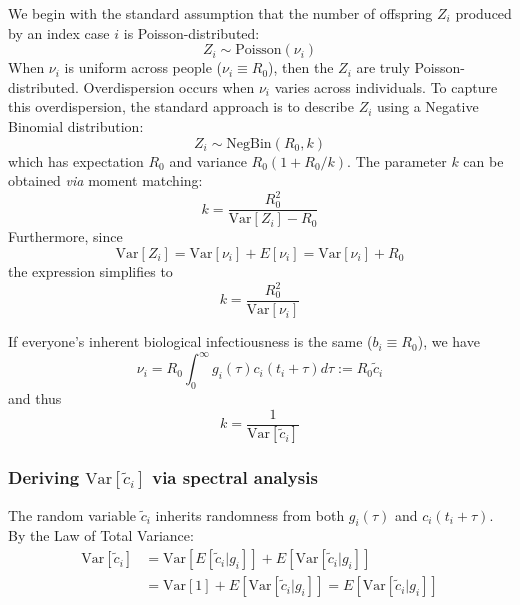 \documentclass[10pt]{article}
\begin{document}
We begin with the standard assumption that the number of offspring $Z_i$ produced by an index case $i$ is Poisson-distributed:
\begin{equation}
	Z_i \sim \text{Poisson}(\nu_i)
\end{equation}
When $\nu_i$ is uniform across people ($\nu_i \equiv R_0$), then the $Z_i$ are truly Poisson-distributed. Overdispersion occurs when $\nu_i$ varies across individuals. To capture this overdispersion, the standard approach is to describe $Z_i$ using a Negative Binomial distribution:
\begin{equation}
	Z_i \sim \text{NegBin}(R_0, k)
\end{equation}
which has expectation $R_0$ and variance $R_0 (1 + R_0 / k)$. The parameter $k$ can be obtained \textit{via} moment matching:
\begin{equation}
	k = \frac{R_0^2}{\text{Var}[Z_i] - R_0}
\end{equation}
Furthermore, since
\begin{equation}
	\text{Var}[Z_i] = \text{Var}[\nu_i] + E[\nu_i] = \text{Var}[\nu_i] + R_0
\end{equation}
the expression simplifies to
\begin{equation}
	k = \frac{R_0^2}{\text{Var}[\nu_i]}
	\label{eq:k_expression}
\end{equation}

If everyone's inherent biological infectiousness is the same ($b_i \equiv R_0$), we have
\begin{equation}
	\nu_i = R_0 \int_0^\infty g_i(\tau) c_i(t_i + \tau) d\tau := R_0 \tilde{c}_i
\end{equation}
and thus
\begin{equation}
	\boxed{k = \frac{1}{\text{Var}[\tilde{c}_i]}}
\end{equation}

\subsubsection{Deriving $\text{Var}[\tilde{c}_i]$ via spectral analysis}

The random variable $\tilde{c}_i$ inherits randomness from both $g_i(\tau)$ and $c_i(t_i+\tau)$. By the Law of Total Variance:
\begin{align}
	\text{Var}[\tilde{c}_i] &= \text{Var}[E[\tilde{c}_i | g_i ]] + E[\text{Var}[\tilde{c}_i | g_i ]] \\
	&= \text{Var}[1] + E[\text{Var}[\tilde{c}_i | g_i ]] = E[\text{Var}[\tilde{c}_i | g_i ]]
\end{align}
\end{document}
